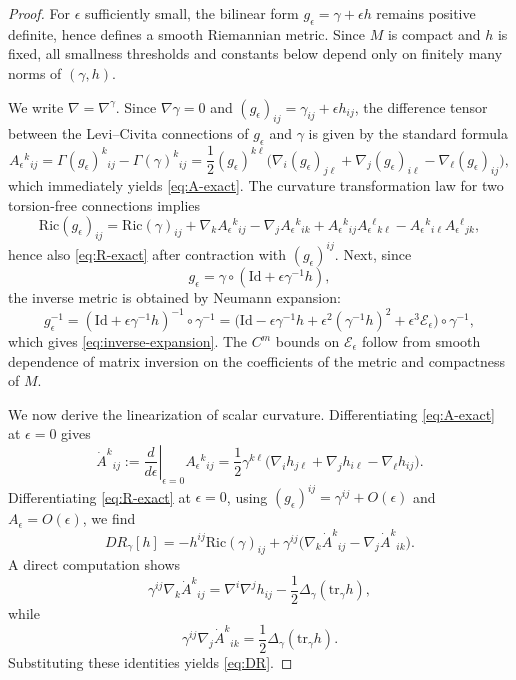 \documentclass{amsart}
\newcommand{\tr}{\mbox{tr}}
\begin{document}
\begin{proof}
For $\epsilon$ sufficiently small, the bilinear form $g_\epsilon=\gamma+\epsilon h$ remains positive
definite, hence defines a smooth Riemannian metric. Since $M$ is compact and $h$ is fixed, all
smallness thresholds and constants below depend only on finitely many norms of $(\gamma,h)$.

\noindent We write $\nabla=\nabla^\gamma$. Since $\nabla\gamma=0$ and $(g_\epsilon)_{ij}=\gamma_{ij}+\epsilon h_{ij}$,
the difference tensor between the Levi--Civita connections of $g_\epsilon$ and $\gamma$ is given by the
standard formula
\[
A_\epsilon{}^{k}{}_{ij}
=
\Gamma(g_\epsilon)^{k}{}_{ij}-\Gamma(\gamma)^{k}{}_{ij}
=
\frac12 (g_\epsilon)^{k\ell}
\big(
\nabla_i(g_\epsilon)_{j\ell}
+\nabla_j(g_\epsilon)_{i\ell}
-\nabla_\ell(g_\epsilon)_{ij}
\big),
\]
which immediately yields \eqref{eq:A-exact}. The curvature transformation law for two torsion-free
connections implies
\[
\text{Ric}(g_\epsilon)_{ij}
=
\text{Ric}(\gamma)_{ij}
+\nabla_k A_\epsilon{}^k{}_{ij}
-\nabla_j A_\epsilon{}^k{}_{ik}
+A_\epsilon{}^k{}_{ij}A_\epsilon{}^\ell{}_{k\ell}
-A_\epsilon{}^k{}_{i\ell}A_\epsilon{}^\ell{}_{jk},
\]
hence also \eqref{eq:R-exact} after contraction with $(g_\epsilon)^{ij}$.
\noindent Next, since
\[
g_\epsilon=\gamma\circ(\text{Id}+\epsilon \gamma^{-1}h),
\]
the inverse metric is obtained by Neumann expansion:
\[
g_\epsilon^{-1}
=
(\text{Id}+\epsilon \gamma^{-1}h)^{-1}\circ \gamma^{-1}
=
\big(\text{Id}-\epsilon \gamma^{-1}h+\epsilon^2(\gamma^{-1}h)^2+\epsilon^3\mathcal E_\epsilon\big)\circ \gamma^{-1},
\]
which gives \eqref{eq:inverse-expansion}. The $C^m$ bounds on $\mathcal E_\epsilon$ follow from
smooth dependence of matrix inversion on the coefficients of the metric and compactness of $M$.

\noindent We now derive the linearization of scalar curvature. Differentiating \eqref{eq:A-exact} at $\epsilon=0$ gives
\[
\dot A^{k}{}_{ij}
:=
\left.\frac{d}{d\epsilon}\right|_{\epsilon=0}A_\epsilon{}^{k}{}_{ij}
=
\frac12\gamma^{k\ell}
\big(
\nabla_i h_{j\ell}
+\nabla_j h_{i\ell}
-\nabla_\ell h_{ij}
\big).
\]
Differentiating \eqref{eq:R-exact} at $\epsilon=0$, using $(g_\epsilon)^{ij}=\gamma^{ij}+O(\epsilon)$ and
$A_\epsilon=O(\epsilon)$, we find
\[
DR_\gamma[h]
=
-h^{ij}\text{Ric}(\gamma)_{ij}
+\gamma^{ij}\big(\nabla_k\dot A^{k}{}_{ij}-\nabla_j\dot A^{k}{}_{ik}\big).
\]
A direct computation shows
\[
\gamma^{ij}\nabla_k\dot A^{k}{}_{ij}
=
\nabla^i\nabla^j h_{ij}-\frac12\Delta_\gamma(\tr_\gamma h),
\]
while
\[
\gamma^{ij}\nabla_j\dot A^{k}{}_{ik}
=
\frac12\Delta_\gamma(\tr_\gamma h).
\]
Substituting these identities yields \eqref{eq:DR}.


\end{proof}
\end{document}
